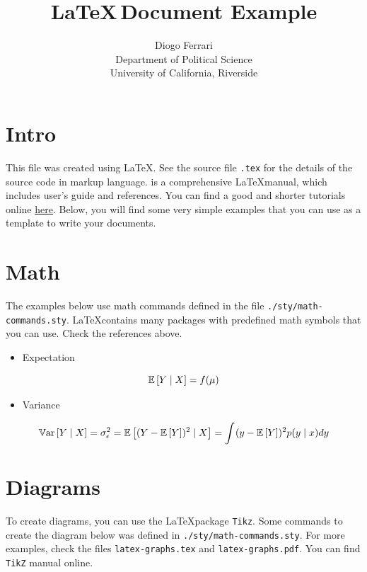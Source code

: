\documentclass[a4paper]{article}
\author{Diogo Ferrari\\
Department of Political Science\\
University of California, Riverside\\
}
\date{}
\title{\LaTeX \(\,\)Document Example}
\begin{document}
\maketitle


\section{Intro}
\label{sec:org8b8764c}

This file was created using \LaTeX. See the source file \texttt{.tex} for the details of the source code in markup language. \cite{lamport1994latex} is a comprehensive \LaTeX manual, which includes user's guide and references. You can find a good and shorter tutorials online \href{https://www.latex-tutorial.com/}{here}. Below, you will find some very simple examples that you can use as a template to write your documents.



\section{Math}
\label{sec:org198a900}


The examples below use math commands defined in the file \texttt{./sty/math-commands.sty}. \LaTeX contains many packages with predefined math symbols that you can use. Check the references above.

\begin{itemize}
\item Expectation
\end{itemize}
\[
\mathbb{E}\left[ Y \mid X \right] = f(\mu )
\]
\begin{itemize}
\item Variance
\end{itemize}
\[
\mathbb{V}\text{ar}\left[Y \mid X \right] = \sigma_{\epsilon }^{2} = \mathbb{E}\left[ (Y - \mathbb{E}\left[ Y \right])^2 \mid X \right]=\int_{}^{} (y-\mathbb{E}\left[ Y \right])^2p(y \mid x)dy 
\]
\section{Diagrams}
\label{sec:orga16fdad}

To create diagrams, you can use the \LaTeX package \texttt{Tikz}. Some commands to create the diagram below was defined in \texttt{./sty/math-commands.sty}. For more examples, check the files \texttt{latex-graphs.tex} and \texttt{latex-graphs.pdf}. You can find \texttt{TikZ} manual online.
\end{document}
